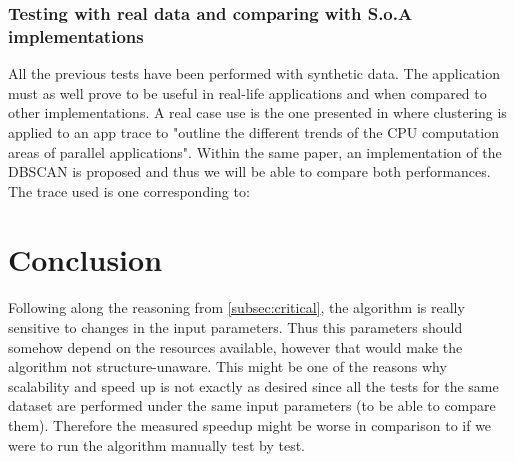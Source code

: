 \documentclass[10pt,journal,compsoc]{IEEEtran}
\begin{document}
\subsubsection{Testing with real data and comparing with S.o.A implementations}

All the previous tests have been performed with synthetic data. The application must as well prove to be useful in real-life applications and when compared to other implementations. A real case use is the one presented in \cite{toolsDBSCAN} where clustering is applied to an app trace to "outline the different trends of the CPU computation areas of parallel applications". Within the same paper, an implementation of the DBSCAN is proposed and thus we will be able to compare both performances. The trace used is one corresponding to:



\section{Conclusion} \label{sec:conclusion}

%

Following along the reasoning from \ref{subsec:critical}, the algorithm is really sensitive to changes in the input parameters. Thus this parameters should somehow depend on the resources available, however that would make the algorithm not structure-unaware. This might be one of the reasons why scalability and speed up is not exactly as desired since all the tests for the same dataset are performed under the same input parameters (to be able to compare them). Therefore the measured speedup might be worse in comparison to if we were to run the algorithm manually test by test. 
\end{document}
